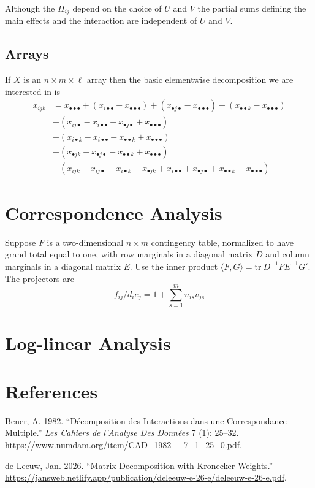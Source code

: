 \documentclass[
  12pt,
  letterpaper,
  DIV=11,
  numbers=noendperiod]{scrartcl}
\newlength{\cslhangindent}
\newenvironment{CSLReferences}[2] %
 {\begin{list}{}{%
  \setlength{\itemindent}{0pt}
  \setlength{\leftmargin}{0pt}
  \setlength{\parsep}{0pt}
  \ifodd #1
   \setlength{\leftmargin}{\cslhangindent}
   \setlength{\itemindent}{-1\cslhangindent}
  \fi
  \setlength{\itemsep}{#2\baselineskip}}}
 {\end{list}}
\newcommand{\sectionbreak}{\clearpage}
\begin{document}
Although the \(\Pi_{ij}\) depend on the choice of \(U\) and \(V\) the
partial sums defining the main effects and the interaction are
independent of \(U\) and \(V\).

\subsection{Arrays}\label{arrays}

If \(X\) is an \(n\times m\times\ell\) array then the basic elementwise
decomposition we are interested in is \begin{align}
x_{ijk}&=x_{\bullet\bullet\bullet}+(x_{i\bullet\bullet}-x_{\bullet\bullet\bullet})+(x_{\bullet j \bullet}-x_{\bullet\bullet\bullet})+(x_{\bullet\bullet k}-x_{\bullet\bullet\bullet})\\
&+(x_{ij\bullet}-x_{i\bullet\bullet}-x_{\bullet j\bullet}+x_{\bullet\bullet\bullet})\\
&+(x_{i\bullet k}-x_{i\bullet\bullet}-x_{\bullet\bullet k}+x_{\bullet\bullet\bullet})\\
&+(x_{\bullet jk}-x_{\bullet j\bullet}-x_{\bullet\bullet k}+x_{\bullet\bullet\bullet})\\
&+(x_{ijk}
-x_{ij\bullet}-x_{i\bullet k}-x_{\bullet jk}+x_{i\bullet\bullet}+x_{\bullet j\bullet}+x_{\bullet\bullet k}-x_{\bullet\bullet\bullet})
\end{align}

\sectionbreak

\section{Correspondence Analysis}\label{correspondence-analysis}

Suppose \(F\) is a two-dimensional \(n\times m\) contingency table,
normalized to have grand total equal to one, with row marginals in a
diagonal matrix \(D\) and column marginals in a diagonal matrix \(E\).
Use the inner product \(\langle F,G\rangle=\text{tr}\ D^{-1}FE^{-1}G'\).
The projectors are \[
f_{ij}/d_ie_j=1+\sum_{s=1}^m u_{is}v_{js}
\]

\section{Log-linear Analysis}\label{log-linear-analysis}

\section*{References}\label{references}

\protect{}\label{refs}
\begin{CSLReferences}{1}{1}
Bener, A. 1982. {``{D{é}composition des Interactions dans une
Correspondance Multiple}.''} \emph{Les Cahiers de l'Analyse Des
Donn{é}es} 7 (1): 25--32.
\url{https://www.numdam.org/item/CAD_1982__7_1_25_0.pdf}.

{de Leeuw, Jan}. 2026. {``Matrix Decomposition with Kronecker
Weights.''}
\url{https://jansweb.netlify.app/publication/deleeuw-e-26-e/deleeuw-e-26-e.pdf}.

\end{CSLReferences}
\end{document}
